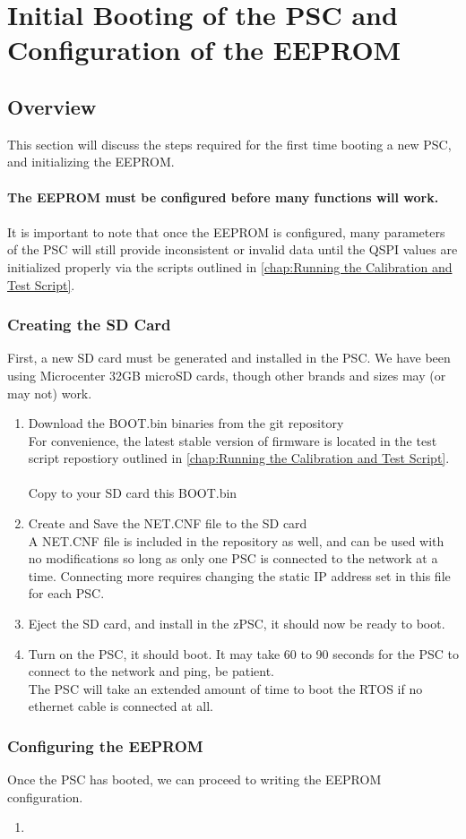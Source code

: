 
\chapter{Initial Booting of the PSC and Configuration of the EEPROM}
\label{chap:Initial Booting of the PSC and Configuration of the EEPROM}
\section{Overview}
This section will discuss the steps required for the first time booting a new PSC, and initializing the EEPROM.\\\\
\textbf{The EEPROM must be configured before many functions will work.}\\\\
It is important to note that once the EEPROM is configured, many parameters of the PSC will still provide inconsistent or invalid data until the QSPI values are initialized properly via the scripts outlined in \autoref{chap:Running the Calibration and Test Script}.

\subsection{Creating the SD Card}
First, a new SD card must be generated and installed in the PSC. We have been using Microcenter 32GB microSD cards, though other brands and sizes may (or may not) work.\\

\begin{enumerate}
	\item Download the BOOT.bin binaries from the git repository\\
	For convenience, the latest stable version of firmware is located in the test script repostiory outlined in \autoref{chap:Running the Calibration and Test Script}.\\\\
	Copy to your SD card this BOOT.bin
	
	\item Create and Save the NET.CNF file to the SD card\\
	A NET.CNF file is included in the repository as well, and can be used with no modifications so long as only one PSC is connected to the network at a time. Connecting more requires changing the static IP address set in this file for each PSC. 
	
	\item Eject the SD card, and install in the zPSC, it should now be ready to boot. 
	
	\item Turn on the PSC, it should boot. It may take 60 to 90 seconds for the PSC to connect to the network and ping, be patient.\\The PSC will take an extended amount of time to boot the RTOS if no ethernet cable is connected at all.  
\end{enumerate}

\subsection{Configuring the EEPROM}
Once the PSC has booted, we can proceed to writing the EEPROM configuration.\\
\begin{enumerate}
	\item 
\end{enumerate}